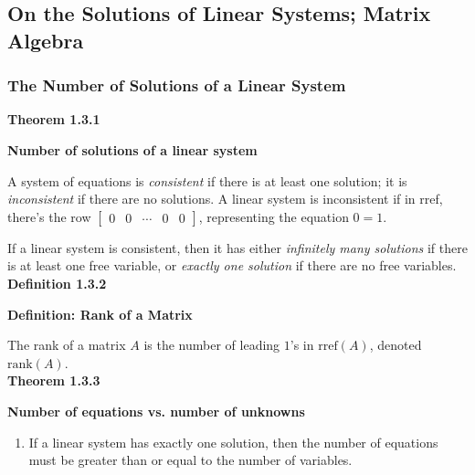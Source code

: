 \subsection{On the Solutions of Linear Systems; Matrix Algebra}
\subsubsection*{The Number of Solutions of a Linear System}
\textbf{Theorem 1.3.1}\\
\par\noindent\textbf{Number of solutions of a linear system}
\par\noindent A system of equations is \textit{consistent} if there is at least one solution; it is \textit{inconsistent} if there are no solutions. A linear system is inconsistent if in rref, there's the row $\left[\begin{array}{cccc|c}0 & 0 & \cdots & 0 & 0\end{array}\right]$, representing the equation $0=1$.
\par\noindent If a linear system is consistent, then it has either \textit{infinitely many solutions} if there is at least one free variable, or \textit{exactly one solution} if there are no free variables.\\
\textbf{Definition 1.3.2}\\
\par\noindent\textbf{Definition: Rank of a Matrix}
\par\noindent The rank of a matrix $A$ is the number of leading $1$'s in $\mathrm{rref}(A)$, denoted $\mathrm{rank}(A)$.\\
\textbf{Theorem 1.3.3}\\
\par\noindent\textbf{Number of equations vs. number of unknowns}
\renewcommand{\labelenumi}{\textbf{(\alph{enumi})}}
\begin{enumerate}
\item If a linear system has exactly one solution, then the number of equations must be greater than or equal to the number of variables.
\end{enumerate}
\par\quad
